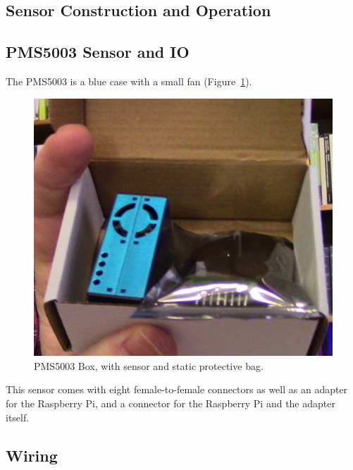 \documentclass{article}
\begin{document}
\subsection{Sensor Construction and Operation}

\subsection{PMS5003 Sensor and IO}

The PMS5003 is a blue case with a small fan (Figure~\ref{fig:PMS5003box}).

\begin{figure}
\includegraphics[width=1.00\textwidth]{images/2_PMS5003_box.JPG}
\caption{PMS5003 Box, with sensor and static protective bag.}
\label{fig:PMS5003box}
\end{figure}

This sensor comes with eight female-to-female connectors as well as an adapter for the Raspberry Pi, and a connector for the Raspberry Pi and the adapter itself.  

\subsection{Wiring}
\end{document}

